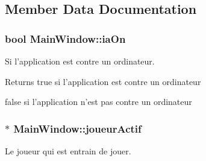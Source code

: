 \subsection{Member Data Documentation}
\hypertarget{class_main_window_a68723ed09b653ede2bd97dd85928076b}{
\subsubsection[{ia\-On}]{\setlength{\rightskip}{0pt plus 5cm}bool Main\-Window\-::ia\-On}}\label{class_main_window_a68723ed09b653ede2bd97dd85928076b}


Si l'application est contre un ordinateur. 

\begin{DoxyReturn}{Returns}
true si l'application est contre un ordinateur 

false si l'application n'est pas contre un ordinateur 
\end{DoxyReturn}
\hypertarget{class_main_window_a70a2607d9b49f3b5cd32afec1cb614a9}{
\subsubsection[{joueur\-Actif}]{$\ast$ Main\-Window\-::joueur\-Actif}}\label{class_main_window_a70a2607d9b49f3b5cd32afec1cb614a9}


Le joueur qui est entrain de jouer. 

